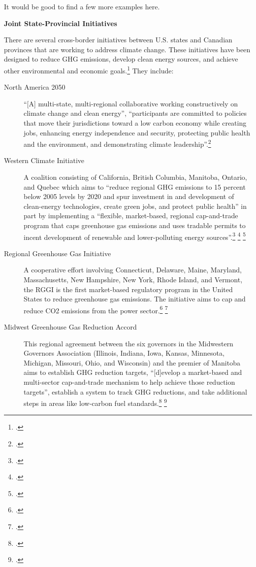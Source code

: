 \begin{vcom}
It would be good to find a few more examples here.
\end{vcom}


\textbf{Joint State-Provincial Initiatives}



There are several cross-border initiatives between U.S. states and Canadian provinces that are working to address climate change. These initiatives have been designed to reduce GHG emissions, develop clean energy sources, and achieve other environmental and economic goals.\footcite[][]{CCESinitiatives} They include:
\begin{description}
	\item[North America 2050] ``[A] multi-state, multi-regional collaborative working constructively on climate change and clean energy'', ``participants are committed to policies that move their jurisdictions toward a low carbon economy while creating jobs, enhancing energy independence and security, protecting public health and the environment, and demonstrating climate leadership''.\footcite[][]{CCESinitiatives}
	\item[Western Climate Initiative] A coalition consisting of California, British Columbia, Manitoba, Ontario, and Quebec which aims to ``reduce regional GHG emissions to 15 percent below 2005 levels by 2020 and spur investment in and development of clean-energy technologies, create green jobs, and protect public health'' in part by implementing a ``flexible, market-based, regional cap-and-trade program that caps greenhouse gas emissions and uses tradable permits to incent development of renewable and lower-polluting energy sources''.\footcite[][]{WCIPartners} \footcite[][]{WCIProgram} \footcite[][]{CCESinitiatives}
	\item[Regional Greenhouse Gas Initiative] A cooperative effort involving Connecticut, Delaware, Maine, Maryland, Massachusetts, New Hampshire, New York, Rhode Island, and Vermont, the RGGI is the first market-based regulatory program in the United States to reduce greenhouse gas emissions. The initiative aims to cap and reduce CO2 emissions from the power sector.\footcite[][]{RGGIWelcome} \footcite[][]{CCESinitiatives}
	\item[Midwest Greenhouse Gas Reduction Accord] This regional agreement between the six governors in the Midwestern Governors Association (Illinois, Indiana, Iowa, Kansas, Minnesota, Michigan, Missouri, Ohio, and Wisconsin) and the premier of Manitoba aims to establish GHG reduction targets, ``[d]evelop a market-based and multi-sector cap-and-trade mechanism to help achieve those reduction targets'', establish a system to track GHG reductions, and take additional steps in areas like low-carbon fuel standards.\footcite[][]{GovsClimatePlatform} \footcite[][]{CCESinitiatives}

\end{description}
